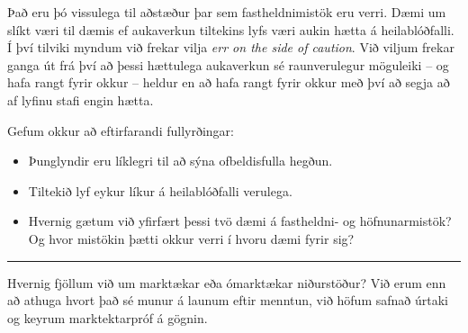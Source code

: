 \documentclass[
]{book}
\theoremstyle{definition}
\theoremstyle{definition}
\theoremstyle{definition}
\theoremstyle{definition}
\theoremstyle{remark}
\begin{document}
Það eru þó vissulega til aðstæður þar sem fastheldnimistök eru verri. Dæmi um slíkt væri til dæmis ef aukaverkun tiltekins lyfs væri aukin hætta á heilablóðfalli. Í því tilviki myndum við frekar vilja \emph{err on the side of caution}. Við viljum frekar ganga út frá því að þessi hættulega aukaverkun sé raunverulegur möguleiki -- og hafa rangt fyrir okkur -- heldur en að hafa rangt fyrir okkur með því að segja að af lyfinu stafi engin hætta.

Gefum okkur að eftirfarandi fullyrðingar:

\begin{itemize}
\item
  Þunglyndir eru líklegri til að sýna ofbeldisfulla hegðun.
\item
  Tiltekið lyf eykur líkur á heilablóðfalli verulega.
\item
  Hvernig gætum við yfirfært þessi tvö dæmi á fastheldni- og höfnunarmistök? Og hvor mistökin þætti okkur verri í hvoru dæmi fyrir sig?
\end{itemize}

\begin{center}\rule{0.5\linewidth}{0.5pt}\end{center}

Hvernig fjöllum við um marktækar eða ómarktækar niðurstöður? Við erum enn að athuga hvort það sé munur á launum eftir menntun, við höfum safnað úrtaki og keyrum marktektarpróf á gögnin.
\end{document}
